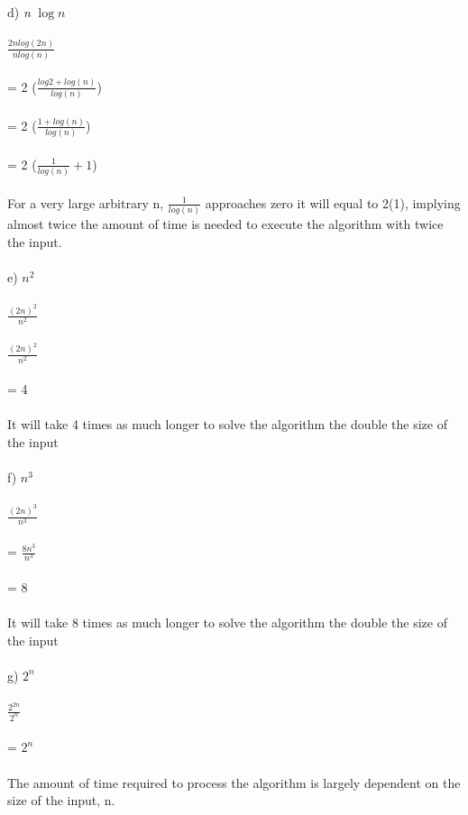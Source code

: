 \documentclass{article}
\begin{document}
{d) \emph{n} $\log{n}$ \\ \\ 
$\frac{2nlog(2n)}{n log (n)}$\\ \\
= 2 ($\frac{log2 + log(n)}{log (n)}$)\\ \\
= 2 ($\frac{1 + log(n)}{log (n)}$)\\ \\
= 2 ($\frac{1}{log (n)} + 1$)\\ \\
For a very large arbitrary n, $\frac{1}{log (n)}$ approaches zero it will equal to 2(1), implying almost twice the amount of time is needed to execute the algorithm with twice the input. \\\\
e) $n^2$ \\ \\ 
$\frac{(2n)^2}{n^2}$ \\\\
$\frac{(2n)^2}{n^2}$  \\\\
= 4 \\\\
It will take 4 times as much longer to solve the algorithm the double the size of the input  \\\\
f)  $n^3$ \\ \\ 
$\frac{(2n)^3}{n^3}$ \\\\
= $\frac{8n^3}{n^3}$ \\\\
= 8 \\\\
It will take 8 times as much longer to solve the algorithm the double the size of the input \\\\
g) $2^n$ \\ \\ 
$\frac{2^{2n}}{2^n}$ \\\\
= $2^n$\\\\
The amount of time required to process the algorithm is largely dependent on the size of the input, n. 
\newpage
}
\end{document}
